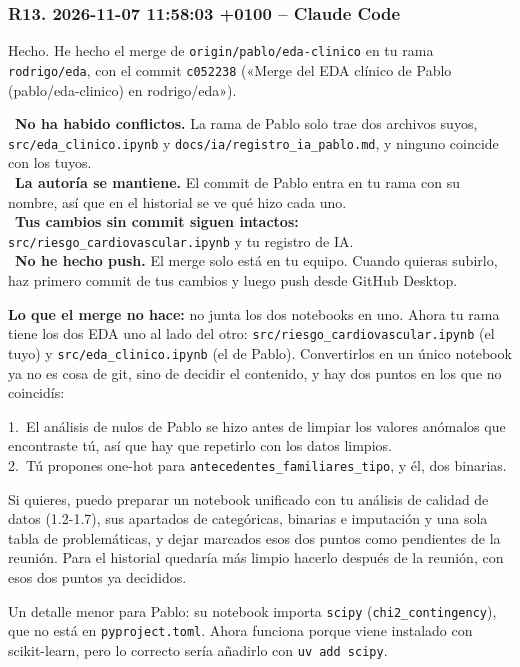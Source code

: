 \documentclass[11pt,a4paper]{article}
\begin{document}
\subsubsection*{R13. 2026-11-07 11:58:03 +0100 -- Claude Code}
{\small
Hecho. He hecho el merge de \texttt{origin/\allowbreak{}pablo/\allowbreak{}eda-clinico} en tu rama \texttt{rodrigo/\allowbreak{}eda}, con el commit \texttt{c052238} («Merge del EDA clínico de Pablo (pablo/\allowbreak{}eda-clinico) en rodrigo/\allowbreak{}eda»).

\hspace*{1.0em}\textbullet~\textbf{No ha habido conflictos.} La rama de Pablo solo trae dos archivos suyos, \texttt{src/\allowbreak{}eda\_\allowbreak{}clinico.ipynb} y \texttt{docs/\allowbreak{}ia/\allowbreak{}registro\_\allowbreak{}ia\_\allowbreak{}pablo.md}, y ninguno coincide con los tuyos. \\{}
\hspace*{1.0em}\textbullet~\textbf{La autoría se mantiene.} El commit de Pablo entra en tu rama con su nombre, así que en el historial se ve qué hizo cada uno. \\{}
\hspace*{1.0em}\textbullet~\textbf{Tus cambios sin commit siguen intactos:} \texttt{src/\allowbreak{}riesgo\_\allowbreak{}cardiovascular.ipynb} y tu registro de IA. \\{}
\hspace*{1.0em}\textbullet~\textbf{No he hecho push.} El merge solo está en tu equipo. Cuando quieras subirlo, haz primero commit de tus cambios y luego push desde GitHub Desktop.

\textbf{Lo que el merge no hace:} no junta los dos notebooks en uno. Ahora tu rama tiene los dos EDA uno al lado del otro: \texttt{src/\allowbreak{}riesgo\_\allowbreak{}cardiovascular.ipynb} (el tuyo) y \texttt{src/\allowbreak{}eda\_\allowbreak{}clinico.ipynb} (el de Pablo). Convertirlos en un único notebook ya no es cosa de git, sino de decidir el contenido, y hay dos puntos en los que no coincidís:

\hspace*{1.0em}1.~El análisis de nulos de Pablo se hizo antes de limpiar los valores anómalos que encontraste tú, así que hay que repetirlo con los datos limpios. \\{}
\hspace*{1.0em}2.~Tú propones one-hot para \texttt{antecedentes\_\allowbreak{}familiares\_\allowbreak{}tipo}, y él, dos binarias.

Si quieres, puedo preparar un notebook unificado con tu análisis de calidad de datos (1.2-1.7), sus apartados de categóricas, binarias e imputación y una sola tabla de problemáticas, y dejar marcados esos dos puntos como pendientes de la reunión. Para el historial quedaría más limpio hacerlo después de la reunión, con esos dos puntos ya decididos.

Un detalle menor para Pablo: su notebook importa \texttt{scipy} (\texttt{chi2\_\allowbreak{}contingency}), que no está en \texttt{pyproject.toml}. Ahora funciona porque viene instalado con scikit-learn, pero lo correcto sería añadirlo con \texttt{uv add scipy}.

}
\end{document}

